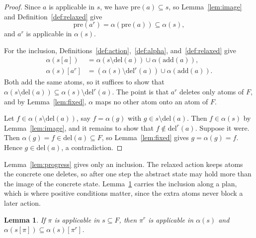 \documentclass{article}
\theoremstyle{definition}
\theoremstyle{plain}
\newtheorem{lemma}{Lemma}
\theoremstyle{definition}
\begin{document}
\begin{proof}
Since $a$ is applicable in $s$, we have $\mathrm{pre}(a) \subseteq s$, so Lemma~\ref{lem:image} and Definition~\ref{def:relaxed} give
\[
  \mathrm{pre}(a^r) = \alpha(\mathrm{pre}(a)) \subseteq \alpha(s),
\]
and $a^r$ is applicable in $\alpha(s)$.

For the inclusion, Definitions~\ref{def:action},~\ref{def:alpha}, and~\ref{def:relaxed} give
\begin{align*}
  \alpha(s[a]) &= \alpha(s \setminus \mathrm{del}(a)) \cup \alpha(\mathrm{add}(a)),\\
  \alpha(s)[a^r] &= (\alpha(s) \setminus \mathrm{del}^r(a)) \cup \alpha(\mathrm{add}(a)).
\end{align*}
Both add the same atoms, so it suffices to show that $\alpha(s \setminus \mathrm{del}(a)) \subseteq \alpha(s) \setminus \mathrm{del}^r(a)$. The point is that $a^r$ deletes only atoms of $F$, and by Lemma~\ref{lem:fixed}, $\alpha$ maps no other atom onto an atom of $F$.

Let $f \in \alpha(s \setminus \mathrm{del}(a))$, say $f = \alpha(g)$ with $g \in s \setminus \mathrm{del}(a)$. Then $f \in \alpha(s)$ by Lemma~\ref{lem:image}, and it remains to show that $f \notin \mathrm{del}^r(a)$. Suppose it were. Then $\alpha(g) = f \in \mathrm{del}(a) \subseteq F$, so Lemma~\ref{lem:fixed} gives $g = \alpha(g) = f$. Hence $g \in \mathrm{del}(a)$, a contradiction.
\end{proof}

Lemma~\ref{lem:progress} gives only an inclusion. The relaxed action keeps atoms the concrete one deletes, so after one step the abstract state may hold more than the image of the concrete state. Lemma~\ref{lem:plan} carries the inclusion along a plan, which is where positive conditions matter, since the extra atoms never block a later action.

\begin{lemma}\label{lem:plan}
If $\pi$ is applicable in $s \subseteq F$, then $\pi^r$ is applicable in $\alpha(s)$ and $\alpha(s[\pi]) \subseteq \alpha(s)[\pi^r]$.
\end{lemma}
\end{document}
